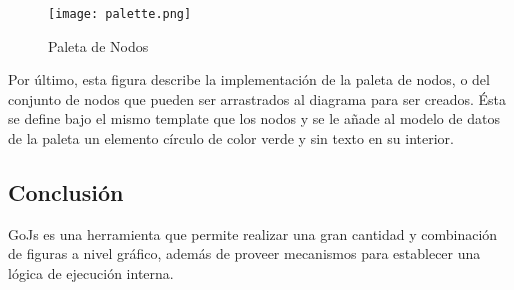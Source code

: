 \vspace{5mm}

\begin{figure}[H]
	\centering
	\texttt{[image: palette.png]}
	\caption{Paleta de Nodos}\label{fig:palette}
\end{figure}
\vspace{5mm}

Por último, esta figura describe la implementación de la paleta de nodos, o del conjunto de nodos que pueden ser arrastrados al diagrama para ser creados. Ésta se define bajo el mismo template que los nodos y se le añade al modelo de datos de la paleta un elemento círculo de color verde y sin texto en su interior.

\subsection{Conclusión}

GoJs es una herramienta que permite realizar una gran cantidad y combinación de figuras a nivel gráfico, además de proveer mecanismos para establecer una lógica de ejecución interna.